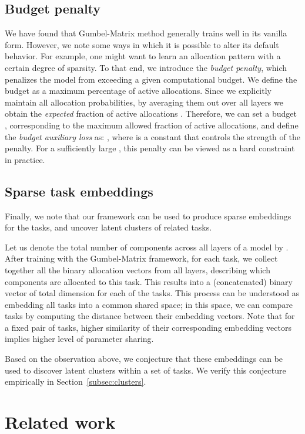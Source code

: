 \documentclass[conference]{IEEEtran}
\begin{document}
\subsection{Budget penalty}
We have found that Gumbel-Matrix method generally trains well in its vanilla form. However, we note some ways in which it is possible to alter its default behavior. For example, one might want to learn an allocation pattern with a certain degree of sparsity. To that end, we introduce the \textit{budget penalty}, which penalizes the model from exceeding a given computational budget. We define the budget as a maximum percentage of active allocations. Since we explicitly maintain all allocation probabilities, by averaging them out over all layers we obtain the \textit{expected} fraction of active allocations . Therefore, we can set a budget , corresponding to the maximum allowed fraction of active allocations, and define the \textit{budget auxiliary loss} as: , where  is a constant that controls the strength of the penalty. For a sufficiently large , this penalty can be viewed as a hard constraint in practice.

\subsection{Sparse task embeddings}\label{subsec:embeddings}

Finally, we note that our framework can be used to produce sparse embeddings for the tasks, and uncover latent clusters of related tasks.

Let us denote the total number of components across all layers of a model by . After training with the Gumbel-Matrix framework,
for each task, we collect together all the binary allocation vectors from all layers, describing which components are allocated to this task. This results into a (concatenated) binary vector of total dimension  for each of the  tasks. This process can be understood as embedding all tasks into a common shared space; in this space, we can compare tasks by computing the distance between their embedding vectors. Note that for a fixed pair of tasks, higher similarity of their corresponding embedding vectors implies higher level of parameter sharing.

Based on the observation above, we conjecture that these embeddings can be used to discover latent clusters within a set of tasks. We verify this conjecture empirically in Section~\ref{subsec:clusters}.

\section{Related work}\label{sec:related_work}
\end{document}

